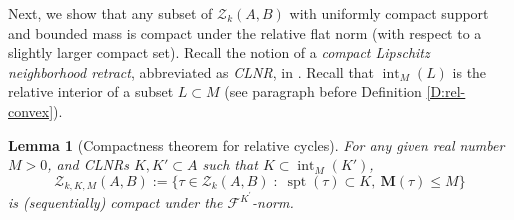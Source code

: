 \documentclass[10pt]{amsart}
\newtheorem{lemma}[theorem]{Lemma}
\theoremstyle{definition}
\theoremstyle{remark}
\numberwithin{equation}{section}
\newcommand{\F}{\mathcal{F}}
\newcommand{\pr}{\prime}
\newcommand{\Z}{\mathcal{Z}}
\newcommand{\M}{\mathbf{M}}
\newcommand{\spt}{\operatorname{spt}}
\newcommand{\interior}{\operatorname{int}}
\begin{document}
Next, we show that any subset of $\Z_k(A, B)$ with uniformly compact support and bounded mass is compact under the relative flat norm (with respect to a slightly larger compact set). Recall the notion of a {\em compact Lipschitz neighborhood retract}, abbreviated as {\em CLNR}, in \cite[\S 1]{Almgren62}. Recall that $\interior_M(L)$ is the relative interior of a subset $L \subset M$ (see paragraph before Definition \ref{D:rel-convex}).

\begin{lemma}[Compactness theorem for relative cycles]
\label{L:compactness}
For any given real number $M>0$, and CLNRs $K,K' \subset A$ such that $K \subset \interior_M(K')$, 
\[ \Z_{k, K, M}(A, B):=\{\tau\in\Z_{k}(A, B) \; : \; \spt(\tau)\subset K,\ \M(\tau)\leq M\}\]
is (sequentially) compact under the $\F^{K^{\pr}}$-norm.
\end{lemma}
\end{document}
